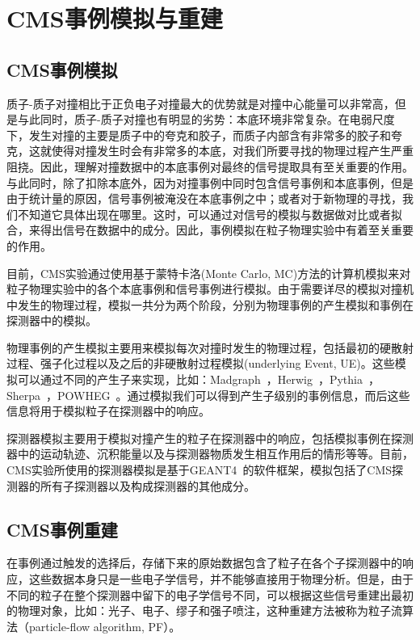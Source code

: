 
\chapter{CMS事例模拟与重建}

\section{CMS事例模拟}

质子-质子对撞相比于正负电子对撞最大的优势就是对撞中心能量可以非常高，但是与此同时，质子-质子对撞也有明显的劣势：本底环境非常复杂。在电弱尺度下，发生对撞的主要是质子中的夸克和胶子，而质子内部含有非常多的胶子和夸克，这就使得对撞发生时会有非常多的本底，对我们所要寻找的物理过程产生严重阻挠。因此，理解对撞数据中的本底事例对最终的信号提取具有至关重要的作用。与此同时，除了扣除本底外，因为对撞事例中同时包含信号事例和本底事例，但是由于统计量的原因，信号事例被淹没在本底事例之中；或者对于新物理的寻找，我们不知道它具体出现在哪里。这时，可以通过对信号的模拟与数据做对比或者拟合，来得出信号在数据中的成分。因此，事例模拟在粒子物理实验中有着至关重要的作用。

目前，CMS实验通过使用基于蒙特卡洛(Monte Carlo, MC)方法的计算机模拟来对粒子物理实验中的各个本底事例和信号事例进行模拟。由于需要详尽的模拟对撞机中发生的物理过程，模拟一共分为两个阶段，分别为物理事例的产生模拟和事例在探测器中的模拟。

物理事例的产生模拟主要用来模拟每次对撞时发生的物理过程，包括最初的硬散射过程、强子化过程以及之后的非硬散射过程模拟(underlying Event, UE)。这些模拟可以通过不同的产生子来实现，比如：Madgraph~\cite{alwall2014automated}，Herwig~\cite{bellm2016herwig}，Pythia~\cite{sjostrand2008brief}，Sherpa~\cite{gleisberg2009event}，POWHEG~\cite{alioli2010general}。通过模拟我们可以得到产生子级别的事例信息，而后这些信息将用于模拟粒子在探测器中的响应。

探测器模拟主要用于模拟对撞产生的粒子在探测器中的响应，包括模拟事例在探测器中的运动轨迹、沉积能量以及与探测器物质发生相互作用后的情形等等。目前，CMS实验所使用的探测器模拟是基于GEANT4~\cite{agostinelli2003geant4}的软件框架，模拟包括了CMS探测器的所有子探测器以及构成探测器的其他成分。

\section{CMS事例重建}

在事例通过触发的选择后，存储下来的原始数据包含了粒子在各个子探测器中的响应，这些数据本身只是一些电子学信号，并不能够直接用于物理分析。但是，由于不同的粒子在整个探测器中留下的电子学信号不同，可以根据这些信号重建出最初的物理对象，比如：光子、电子、缪子和强子喷注，这种重建方法被称为粒子流算法（particle-flow algorithm, PF）。

